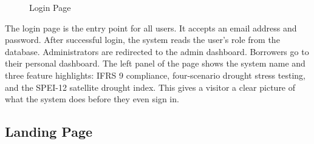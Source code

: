 \documentclass[12pt,a4paper]{article}
\begin{document}
\begin{figure}[H]
\caption{Login Page}
\label{fig:login}
\end{figure}

The login page is the entry point for all users. It accepts an email address and password. After successful login, the system reads the user's role from the database. Administrators are redirected to the admin dashboard. Borrowers go to their personal dashboard. The left panel of the page shows the system name and three feature highlights: IFRS 9 compliance, four-scenario drought stress testing, and the SPEI-12 satellite drought index. This gives a visitor a clear picture of what the system does before they even sign in.

\subsection{Landing Page}
\end{document}
